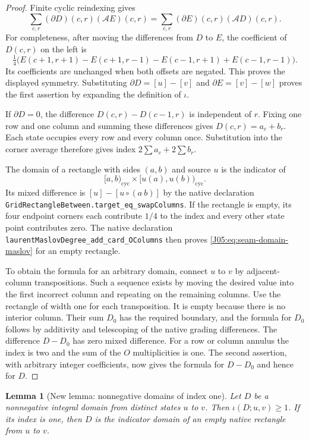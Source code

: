 \documentclass[11pt,oneside]{report}
\newtheorem{lemma}[theorem]{Lemma}
\theoremstyle{definition}
\numberwithin{equation}{section}
\newcommand{\decl}[1]{\textnormal{\nolinkurl{#1}}}
\begin{document}
\begin{proof}
Finite cyclic reindexing gives
\[
 \sum_{c,r}(\partial D)(c,r)(\mathcal A E)(c,r)
 =\sum_{c,r}(\partial E)(c,r)(\mathcal A D)(c,r).
\]
For completeness, after moving the differences from $D$ to $E$, the
coefficient of $D(c,r)$ on the left is
\[
 \tfrac14\bigl(E(c+1,r+1)-E(c+1,r-1)
             -E(c-1,r+1)+E(c-1,r-1)\bigr).
\]
Its coefficients are unchanged when both offsets are negated. This
proves the displayed symmetry. Substituting
$\partial D=[u]-[v]$ and $\partial E=[v]-[w]$ proves the first assertion
by expanding the definition of $\iota$.

If $\partial D=0$, the difference $D(c,r)-D(c-1,r)$ is independent
of $r$. Fixing one row and one column and summing these differences
gives $D(c,r)=a_c+b_r$. Each state occupies every row and every column
once. Substitution into the corner average therefore gives index
$2\sum a_c+2\sum b_r$.

The domain of a rectangle with sides $(a,b)$ and source $u$ is the
indicator of
\[
 [a,b)_{\mathrm{cyc}}\times[u(a),u(b))_{\mathrm{cyc}}.
\]
Its mixed difference is $[u]-[u\circ(a\ b)]$ by the native declaration
\decl{GridRectangleBetween.target_eq_swapColumns}.
If the rectangle is empty, its four endpoint corners each contribute
$1/4$ to the index and every other state point contributes zero.
The native declaration \decl{laurentMaslovDegree_add_card_OColumns}
then proves \eqref{J05:eq:seam-domain-maslov} for an empty rectangle.

To obtain the formula for an arbitrary domain, connect $u$ to $v$ by
adjacent-column transpositions. Such a sequence exists by moving the
desired value into the first incorrect column and repeating on the
remaining columns. Use the rectangle of width one for each transposition.
It is empty because there is no interior column. Their sum $D_0$ has
the required boundary, and the formula for $D_0$ follows by additivity
and telescoping of the native grading differences. The difference
$D-D_0$ has zero mixed difference. For a row or column annulus the
index is two and the sum of the $O$ multiplicities is one.
The second assertion, with arbitrary integer coefficients, now gives
the formula for $D-D_0$ and hence for $D$.
\end{proof}

\begin{lemma}[New lemma: nonnegative domains of index one]
\label{J05:lem:seam-index-one-rectangle}
Let $D$ be a nonnegative integral domain from distinct states $u$ to
$v$. Then $\iota(D;u,v)\ge1$. If its index is one, then $D$ is the
indicator domain of an empty native rectangle from $u$ to $v$.
\end{lemma}
\end{document}
